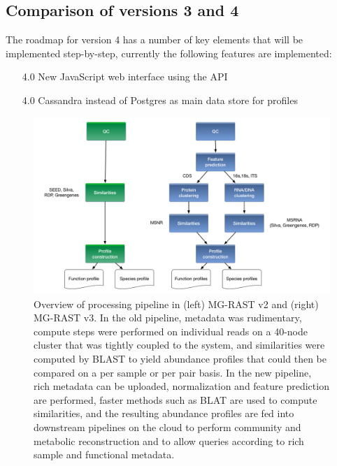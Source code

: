 \documentclass[12pt,fullpage]{report}
\begin{document}
\subsection*{Comparison of versions 3 and 4}

The roadmap for version 4 has a number of key elements that will be implemented step-by-step, currently the following features are implemented:

\begin{itemize}
\item [4.0] New JavaScript web interface using the API
\item [4.0] Cassandra instead of Postgres as main data store for profiles
\end{itemize}

\begin{figure}
\begin{center}
\includegraphics[width=6in]{Images/mgrastv2VSv3.png}
\end{center}
\caption{
Overview of processing pipeline in (left) MG-RAST v2 and (right) MG-RAST v3. In the old pipeline, metadata was rudimentary, compute steps were performed on individual reads on a 40-node cluster that was tightly coupled to the system, and similarities were computed by BLAST to yield abundance profiles that could then be compared on a per sample or per pair basis. In the new pipeline, rich metadata can be uploaded, normalization and feature prediction are performed, faster methods such as BLAT are used to compute similarities, and the resulting abundance profiles are fed into downstream pipelines on the cloud to perform community and metabolic reconstruction and to allow queries according to rich sample and functional metadata.
}
\label{fig:mgrastv2VSv3}
\end{figure}
\end{document}
